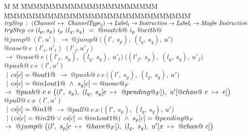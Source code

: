 

\newcommand\nextStep[5]{\big((#1,~#2),~(#3,~#4),~#5 \big)}


\begin{figure*}
\begin{tabbing}
M \= M \= MMMMMMMMMMMMMMMMMMMMMM \= MMMMMMMMMMMMMMMMMMMMMMMMMMMMMM \= \kill
$\textit{tryStep} ~:~ (\textit{Channel} ~\mapsto~ \textit{ChannelType}_2) \to \textit{Label}_1 \to \textit{Instruction} \to \textit{Label}_1 \to \textit{Maybe}~\textit{Instruction}$ \\
$\textit{tryStep} ~\textit{cs}~(l_p,s_p)~i_p~(l_q,s_q)~=~@match@~i_p~@with@$ \\

\> $@jump@~(l',u')$ 
\> \> $\to~@jump@~
      \nextStep
        {l'}{s_p}
        {l_q}{s_q}
        {u'}
      $ 
\> 
\\[1ex]

\> $@case@~e~(l'_t,u'_t)~(l'_f,u'_f)$
\> \> $\to~@case@~e~
      \nextStep
        {l'_t}{s_p}
        {l_q}{s_q}
        {u'_t}
      ~
      \nextStep
        {l'_f}{s_p}
        {l_q}{s_q}
        {u'_f}
      $ 
\> 
\\[1ex]

\> $@push@~c~e~(l',u')$ \\
\> \> $~|~\textit{cs}[c]=@out1@$ 
\> $\to~@push@~c~e~
      \nextStep
        {l'}
          {s_p}
        {l_q}
          {s_q}
        {u'}
      $ 
\> \\

\> \> $~|~\textit{cs}[c]=@in1out1@ ~\wedge~ s_q[c]=@none@_F$ 
\> $\to~@push@~c~e~
      \nextStep
        {l'}
          {s_p}
        {l_q}
          {\HeapUpdateOne{c}{@pending@_F}{s_q}}
        {\HeapUpdateOne{@chan@~c}{e}{u'}}
      $
\> 
\\[1ex]


\> $@pull@~c~x~(l',u')$ \\
\> \> $~|~\textit{cs}[c]=@in1@$ 
\> $\to~@pull@~c~x~
      \nextStep
        {l'}{s_p}
        {l_q}{s_q}
        {u'}
    $ 
\> 
\\[1ex]

\> \> $~|~(\textit{cs}[c]=@in2@ \vee \textit{cs}[c]=@in1out1@) ~\wedge~ s_p[c]=@pending@_F$ \\
\> \> $\to~@jump@~
      \nextStep
        {l'}
          {\HeapUpdateOne{c}{@have@_F}{s_p}}
        {l_q}
          {s_q}
        {\HeapUpdateOne{x}{@chan@~c}{u'}}
        $ 
\> \>  
\\[1ex]


\end{tabbing}
\end{figure*}
